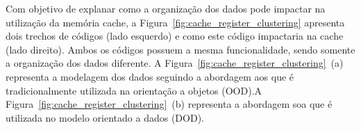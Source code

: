 

Com objetivo de explanar como a organização dos dados pode impactar na utilização da memória cache, a Figura~\ref{fig:cache_register_clustering} apresenta dois trechos de códigos (lado esquerdo) e como este código impactaria na cache (lado direito). Ambos os códigos possuem a mesma funcionalidade, sendo somente a organização dos dados diferente. A Figura~\ref{fig:cache_register_clustering}~(a) representa a modelagem dos dados seguindo a abordagem \ac{aos} que é tradicionalmente utilizada na orientação a objetos (OOD).A Figura~\ref{fig:cache_register_clustering}~(b) representa a abordagem \ac{soa} que é utilizada no modelo orientado a dados (DOD).

